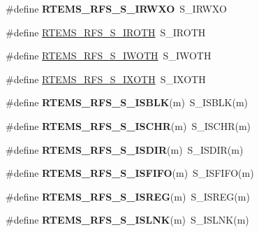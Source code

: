 \begin{DoxyCompactItemize}
\#define {\bfseries R\+T\+E\+M\+S\+\_\+\+R\+F\+S\+\_\+\+S\+\_\+\+I\+R\+W\+XO}~S\+\_\+\+I\+R\+W\+XO
\item 
\#define \mbox{\hyperlink{rtems-rfs-inode_8h_a40139a1d1cb8c6330832c6d7ea042a1c}{R\+T\+E\+M\+S\+\_\+\+R\+F\+S\+\_\+\+S\+\_\+\+I\+R\+O\+TH}}~S\+\_\+\+I\+R\+O\+TH
\item 
\#define \mbox{\hyperlink{rtems-rfs-inode_8h_aa20dabd3e79352a08371ecd4c3506a10}{R\+T\+E\+M\+S\+\_\+\+R\+F\+S\+\_\+\+S\+\_\+\+I\+W\+O\+TH}}~S\+\_\+\+I\+W\+O\+TH
\item 
\#define \mbox{\hyperlink{rtems-rfs-inode_8h_a416c37e90bcdce241cea5050e1a9a96a}{R\+T\+E\+M\+S\+\_\+\+R\+F\+S\+\_\+\+S\+\_\+\+I\+X\+O\+TH}}~S\+\_\+\+I\+X\+O\+TH
\item 
\mbox{\label{rtems-rfs-inode_8h_a9df1f9697d227a8c096cce148bd0c648}} 
\#define {\bfseries R\+T\+E\+M\+S\+\_\+\+R\+F\+S\+\_\+\+S\+\_\+\+I\+S\+B\+LK}(m)~S\+\_\+\+I\+S\+B\+LK(m)
\item 
\mbox{\label{rtems-rfs-inode_8h_aed25f0cf26ec1298f3fed29d5df7a60f}} 
\#define {\bfseries R\+T\+E\+M\+S\+\_\+\+R\+F\+S\+\_\+\+S\+\_\+\+I\+S\+C\+HR}(m)~S\+\_\+\+I\+S\+C\+HR(m)
\item 
\mbox{\label{rtems-rfs-inode_8h_a8b812eae575f2c3d344e339a1e134c35}} 
\#define {\bfseries R\+T\+E\+M\+S\+\_\+\+R\+F\+S\+\_\+\+S\+\_\+\+I\+S\+D\+IR}(m)~S\+\_\+\+I\+S\+D\+IR(m)
\item 
\mbox{\label{rtems-rfs-inode_8h_a7d0e7abca79ed395c52ca8bac9c925ec}} 
\#define {\bfseries R\+T\+E\+M\+S\+\_\+\+R\+F\+S\+\_\+\+S\+\_\+\+I\+S\+F\+I\+FO}(m)~S\+\_\+\+I\+S\+F\+I\+FO(m)
\item 
\mbox{\label{rtems-rfs-inode_8h_af182aa8b5a37ef860efd30a7d735cdcd}} 
\#define {\bfseries R\+T\+E\+M\+S\+\_\+\+R\+F\+S\+\_\+\+S\+\_\+\+I\+S\+R\+EG}(m)~S\+\_\+\+I\+S\+R\+EG(m)
\item 
\mbox{\label{rtems-rfs-inode_8h_a8effd9335d904d4ce53272b403f31727}} 
\#define {\bfseries R\+T\+E\+M\+S\+\_\+\+R\+F\+S\+\_\+\+S\+\_\+\+I\+S\+L\+NK}(m)~S\+\_\+\+I\+S\+L\+NK(m)
\item 
\mbox{\label{rtems-rfs-inode_8h_a1a3096180adfb0ba61028850bd23fbeb}} 

\end{DoxyCompactItemize}
